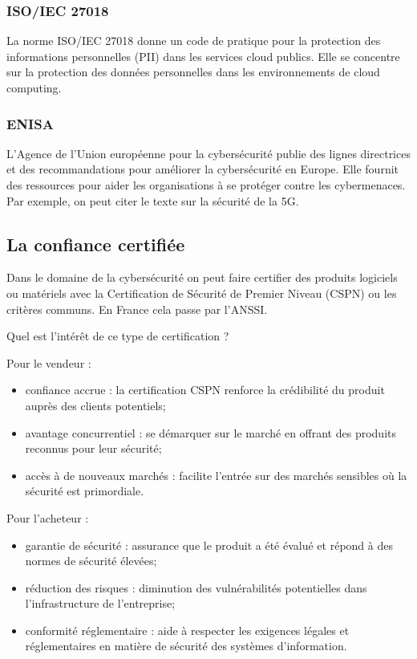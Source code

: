 \subsubsection{ISO/IEC 27018}
La norme ISO/IEC 27018 donne un code de pratique pour la protection des informations personnelles (PII) dans les services cloud publics. Elle se concentre sur la protection des données personnelles dans les environnements de cloud computing.
	
\subsubsection{ENISA}
L'Agence de l'Union européenne pour la cybersécurité publie des lignes directrices et des recommandations pour améliorer la cybersécurité en Europe. Elle fournit des ressources pour aider les organisations à se protéger contre les cybermenaces. Par exemple, on peut citer le texte sur la sécurité de la 5G.
	
\subsection{La confiance certifiée}
Dans le domaine de la cybersécurité on peut faire certifier des produits logiciels ou matériels avec la Certification de Sécurité de Premier Niveau (CSPN) ou les critères communs. En France cela passe par l'ANSSI.

Quel est l'intérêt de ce type de certification ?

Pour le vendeur :
\begin{itemize}
	\item confiance accrue : la certification CSPN renforce la crédibilité du produit auprès des clients potentiels;
	\item avantage concurrentiel : se démarquer sur le marché en offrant des produits reconnus pour leur sécurité;
	\item accès à de nouveaux marchés : facilite l'entrée sur des marchés sensibles où la sécurité est primordiale.
\end{itemize}

Pour l'acheteur :
\begin{itemize}
	\item garantie de sécurité : assurance que le produit a été évalué et répond à des normes de sécurité élevées;
	\item réduction des risques : diminution des vulnérabilités potentielles dans l'infrastructure de l'entreprise;
	\item conformité réglementaire : aide à respecter les exigences légales et réglementaires en matière de sécurité des systèmes d'information.
\end{itemize}

